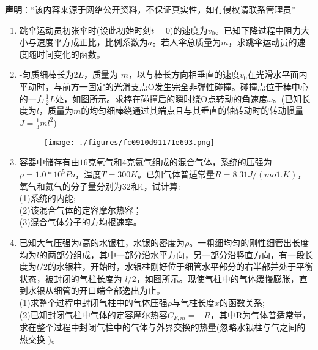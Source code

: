
\textbf{声明}：“该内容来源于网络公开资料，不保证真实性，如有侵权请联系管理员”

\begin{enumerate}
\item 跳伞运动员初张伞时(设此初始时刻$t=0$)的速度为$v_0$。已知下降过程中阻力大小与速度平方成正比，比例系数为$a$。若人伞总质量为$m$，求跳伞运动员的速度随时间变化的函数。
\item -匀质细棒长为$ 2L$，质量为 $m$，以与棒长方向相垂直的速度$v_0$在光滑水平面内平动时，与前方一固定的光滑支点O发生完全非弹性碰撞。碰撞点位于棒中心的一方$\frac{1}{2}L$处，如图所示。求棒在碰撞后的瞬时绕O点转动的角速度$\omega$。(已知长度为$l$，质量为$m$的均匀细棒绕通过其端点且与其垂直的轴转动时的转动惯量$J=\frac{1}{3}ml^2$)
\begin{figure}[ht]
\centering
\texttt{[image: ./figures/fc0910d91171e693.png]}
\caption{} \label{fig_XD11_1}
\end{figure}
\item 容器中储存有由$16$克氧气和$4$克氦气组成的混合气体，系统的压强为$\rho=1.0*10^5Pa$，温度$T=300K$。已知气体普适常量$R=8.31J/(mo1.K)$，氧气和氦气的分子量分别为32和4，试计算:\\
(1)系统的内能;\\
(2)该混合气体的定容摩尔热容；\\
(3)混合气体分子的方均根速率。
\item 已知大气压强为$l$高的水银柱，水银的密度为$\rho$。一粗细均匀的刚性细管出长度均为$l$的两部分组成，其中一部分沿水平方向，另一部分沿竖直方向，有一段长度为$l/2$的水银柱，开始时，水银柱刚好位于细管水平部分的右半部并处于平衡状态，被封闭的气柱长度为 $l/2$，如图所示。现使气柱中的气体缓慢膨胀，直到水银从细管的开口端全部逸出为止。\\
(1)求整个过程中封闭气柱中的气体压强$\rho$与气柱长度$x$的函数关系;\\
(2)已知封闭气柱中气体的定容摩尔热容$C_{F,m}=-R$，其中R为气体普适常量，求在整个过程中封闭气柱中的气体与外界交换的热量(忽略水银柱与气之间的热交换 )。
\end{enumerate}
